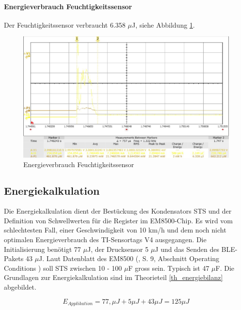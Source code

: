 \paragraph{Energieverbrauch Feuchtigkeitssensor}

Der Feuchtigkeitssensor verbraucht 6.358 $\mu$J, siehe Abbildung \ref{energie_humidity}.

\begin{figure}
  \includegraphics[width=1.0\textwidth]{3Vorgehen/imag/Humidity.png}
  \caption{Energieverbrauch Feuchtigkeitssensor}
  \label{energie_humidity}
\end{figure}




\subsection{Energiekalkulation}
\label{v_e_kalkulation}

Die Energiekalkulation dient der Bestückung des Kondensators STS und der Definition von Schwellwerten für die Register im EM8500-Chip. Es wird vom schlechtesten  Fall, einer Geschwindigkeit von 10 km/h und dem noch nicht optimalen Energieverbrauch des TI-Sensortags V4 ausgegangen. Die Initialisierung benötigt 77 $\mu$J, der Drucksensor 5 $\mu$J und das Senden des BLE-Pakets 43 $\mu$J. Laut Datenblatt des EM8500 (\cite{datasheet_EM85}, S. 9, Abschnitt Operating Conditions ) soll STS zwischen 10 - 100 $\mu$F gross sein. Typisch ist 47 $\mu$F. Die Grundlagen zur Energiekalkulation sind im Theorieteil \ref{th_energiebilanz} abgebildet. 

\begin{equation}
  E_{Applikation} = 77, \mu J + 5 \mu J + 43 \mu J = 125 \mu J
\end{equation}


